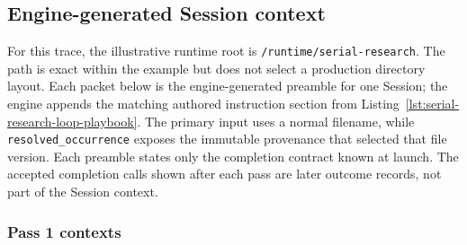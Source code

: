\documentclass[11pt]{article}
\begin{document}
\subsection{Engine-generated Session context}

For this trace, the illustrative runtime root is
\texttt{/runtime/serial-research}. The path is exact within the example but
does not select a production directory layout. Each packet below is the
engine-generated preamble for one Session; the engine appends the matching
authored instruction section from Listing~\ref{lst:serial-research-loop-playbook}.
The primary input uses a normal filename, while
\texttt{resolved\_occurrence} exposes the immutable provenance that selected
that file version.  Each preamble states only the completion contract known at
launch.  The accepted completion calls shown after each pass are later outcome
records, not part of the Session context.

\subsubsection{Pass 1 contexts}
\end{document}
